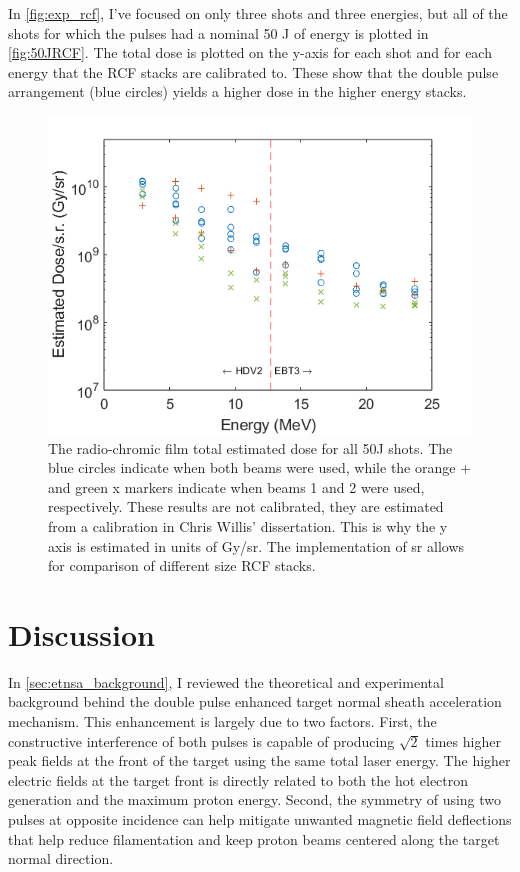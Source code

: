 In \autoref{fig:exp_rcf}, I've focused on only three shots and three energies, but all of the shots for which the pulses had a nominal 50 J of energy is plotted in \autoref{fig:50JRCF}. The total dose is plotted on the y-axis for each shot and for each energy that the \gls{RCF} stacks are calibrated to. These show that the double pulse arrangement (blue circles) yields a higher dose in the higher energy stacks. 

\begin{figure}
	\centering
	\includegraphics[width=0.75\linewidth]{planning/images/titan/50JRCFcompNew.png}
	\caption{The radio-chromic film total estimated dose for all 50J shots. The blue circles indicate when both beams were used, while the orange + and green x markers indicate when beams 1 and 2 were used, respectively. These results are not calibrated, they are estimated from a calibration in Chris Willis' dissertation. This is why the y axis is estimated in units of Gy/sr. The implementation of sr allows for comparison of different size RCF stacks.}
	\label{fig:50JRCF}
\end{figure}

\section{Discussion}

In \autoref{sec:etnsa_background}, I reviewed the theoretical and experimental background behind the double pulse enhanced target normal sheath acceleration mechanism. This enhancement is largely due to two factors. First, the constructive interference of both pulses is capable of producing $\sqrt{2}$ times higher peak fields at the front of the target using the same total laser energy. The higher electric fields at the target front is directly related to both the hot electron generation and the maximum proton energy. Second, the symmetry of using two pulses at opposite incidence can help mitigate unwanted magnetic field deflections that help reduce filamentation and keep proton beams centered along the target normal direction. 

